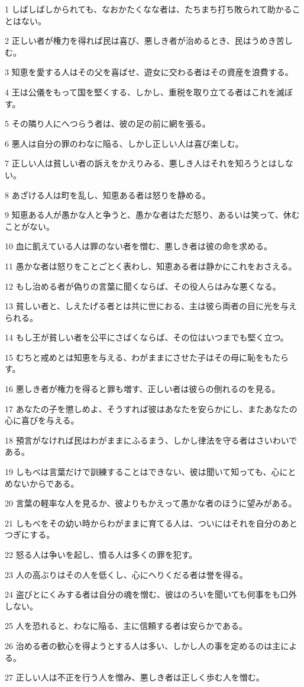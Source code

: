 \par 1 しばしばしかられても、なおかたくなな者は、たちまち打ち敗られて助かることはない。
\par 2 正しい者が権力を得れば民は喜び、悪しき者が治めるとき、民はうめき苦しむ。
\par 3 知恵を愛する人はその父を喜ばせ、遊女に交わる者はその資産を浪費する。
\par 4 王は公儀をもって国を堅くする、しかし、重税を取り立てる者はこれを滅ぼす。
\par 5 その隣り人にへつらう者は、彼の足の前に網を張る。
\par 6 悪人は自分の罪のわなに陥る、しかし正しい人は喜び楽しむ。
\par 7 正しい人は貧しい者の訴えをかえりみる、悪しき人はそれを知ろうとはしない。
\par 8 あざける人は町を乱し、知恵ある者は怒りを静める。
\par 9 知恵ある人が愚かな人と争うと、愚かな者はただ怒り、あるいは笑って、休むことがない。
\par 10 血に飢えている人は罪のない者を憎む、悪しき者は彼の命を求める。
\par 11 愚かな者は怒りをことごとく表わし、知恵ある者は静かにこれをおさえる。
\par 12 もし治める者が偽りの言葉に聞くならば、その役人らはみな悪くなる。
\par 13 貧しい者と、しえたげる者とは共に世におる、主は彼ら両者の目に光を与えられる。
\par 14 もし王が貧しい者を公平にさばくならば、その位はいつまでも堅く立つ。
\par 15 むちと戒めとは知恵を与える、わがままにさせた子はその母に恥をもたらす。
\par 16 悪しき者が権力を得ると罪も増す、正しい者は彼らの倒れるのを見る。
\par 17 あなたの子を懲しめよ、そうすれば彼はあなたを安らかにし、またあなたの心に喜びを与える。
\par 18 預言がなければ民はわがままにふるまう、しかし律法を守る者はさいわいである。
\par 19 しもべは言葉だけで訓練することはできない、彼は聞いて知っても、心にとめないからである。
\par 20 言葉の軽率な人を見るか、彼よりもかえって愚かな者のほうに望みがある。
\par 21 しもべをその幼い時からわがままに育てる人は、ついにはそれを自分のあとつぎにする。
\par 22 怒る人は争いを起し、憤る人は多くの罪を犯す。
\par 23 人の高ぶりはその人を低くし、心にへりくだる者は誉を得る。
\par 24 盗びとにくみする者は自分の魂を憎む、彼はのろいを聞いても何事をも口外しない。
\par 25 人を恐れると、わなに陥る、主に信頼する者は安らかである。
\par 26 治める者の歓心を得ようとする人は多い、しかし人の事を定めるのは主による。
\par 27 正しい人は不正を行う人を憎み、悪しき者は正しく歩む人を憎む。

